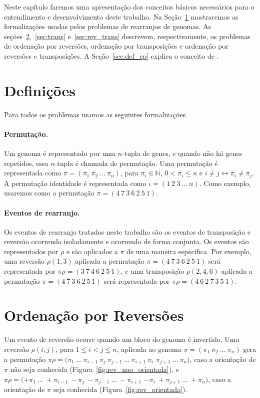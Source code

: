 Neste capítulo faremos uma apresentação dos conceitos básicos
necessários para o entendimento e desenvolvimento deste trabalho. Na
Seção~\ref{sec:defin} mostraremos as formalizações usadas pelos
problemas de rearranjos de genomas. As
seções~\ref{sec:rev},~\ref{sec:trans} e~\ref{sec:rev_trans} descrevem,
respectivamente, os problemas de ordenação por reversões, ordenação por
transposições e ordenação por reversões e transposições. A
Seção~\ref{sec:def_cp} explica o conceito de \pr{}.

\section{Definições}
\label{sec:defin}
Para todos os problemas usamos as seguintes formalizações.

\paragraph{Permutação.} Um genoma é representado por uma $n$-tupla de
genes, e quando não há genes repetidos, essa $n$-tupla é chamada de
permutação. Uma permutação é representada como $\pi =
(\pi_{1}~\pi_{2}~\ldots~\pi_{n})$, para $\pi_{i} \in \mathbb{N}$, $0 <
\pi_{i} \leq n$ e $i \neq j \leftrightarrow \pi_{i} \neq \pi_{j}$. A
permutação identidade é representada como $\iota = (1~2~3~\ldots~n)$.
Como exemplo, usaremos como a permutação $\pi = (4~7~3~6~2~5~1)$.

\paragraph{Eventos de rearranjo.} Os eventos de rearranjo tratados neste
trabalho são os eventos de transposição e reversão ocorrendo
isoladamente e ocorrendo de forma conjunta. Os eventos são representados
por $\rho$ e são aplicados a $\pi$ de uma maneira específica. Por
exemplo, uma reversão $\rho(1, 3)$ aplicada a permutação $\pi =
(4~7~3~6~2~5~1)$ será representada por $\pi\rho = (3~7~4~6~2~5~1)$, e
uma transposição $\rho(2,4,6)$ aplicada a permutação $\pi =
(4~7~3~6~2~5~1)$ será representada por $\pi\rho = (4~6~2~7~3~5~1)$.

\section{Ordenação por Reversões}
\label{sec:rev}
Um evento de reversão ocorre quando um bloco do genoma é invertido. Uma
reversão $\rho(i, j)$, para $1 \leq i < j \leq n$, aplicada ao genoma
$\pi = (\pi_{1}~\pi_{2}~\ldots~\pi_{n})$ gera a permutação $\pi\rho =
(\pi_{1}~\ldots~\pi_{i-1}~\pi_{j}~\pi_{j-1}~\ldots~\pi_{i+1}~\pi_{i}$
$\pi_{j+1}~\ldots~\pi_{n})$, caso a orientação de $\pi$ não seja
conhecida (Figura~\ref{fig:rev_nao_orientada}), e $\pi\rho =
(+\pi_{1}~\ldots~+\pi_{i-1}~-\pi_{j}~-\pi_{j-1}~\ldots~-\pi_{i+1}$
$-\pi_{i}~+\pi_{j+1}~\ldots~+\pi_{n})$, caso a orientação de $\pi$ seja
conhecida (Figura~\ref{fig:rev_orientada}).

